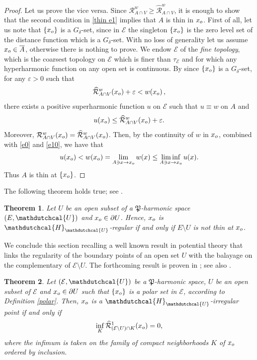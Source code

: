 \documentclass{amsart}
\newtheorem{thm}{Theorem}[section]
\numberwithin{equation}{section}
\def \Hd{{\mathdutchcal{H}}}
\def \Ec{{\mathcal{E}}}
\def \Ud{{\mathdutchcal{U}}}
\def \reduit{{\mathcal{R}}}
\def \balayage{{\widehat{\mathcal{R}}}}
\begin{document}
{{\begin{proof}
Let us prove the vice versa. Since $\reduit^w_{A \cap V} \geq \balayage^w_{A \cap V}$, it is enough to show that the second condition in \eqref{thin e1} implies that $A$ is thin in $x_{\rm o}$.  
First of all, let us note that $\{x_{\rm o}\}$ is a $G_\delta$-set, since in $\Ec$ the singleton $\{x_{\rm o }\}$ is the zero level set of the distance function which is a $G_\delta$-set.
With no loss of generality let us assume $x_{\rm o}  \in \overline{A}$, otherwise there is nothing to prove.
We  endow $\Ec$ of the {\it fine topology}, which is the coarsest topology on $\Ec$ which is finer than $\tau_{\Ec}$ and for which any hyperharmonic function on any open set is continuous. By \cite[Corollary 5.3.2]{CC72} since $\{x_{\rm o}\}$ is a $G_\delta$-set,  for any $\varepsilon>0$ such that
\begin{equation}\label{e0}
    \balayage^w_{A \cap V}(x_{\rm o}) + \varepsilon < 
    w(x_{\rm o})\,,
\end{equation}
there exists a positive superharmonic function $u$ on $\Ec$ such that $u \equiv w$ on $A$ and
\begin{equation}\label{e10}
    u(x_{\rm o}) \leq \balayage^w_{A \cap V}(x_{\rm o}) + \varepsilon.
\end{equation}
 Moreover, $\reduit^w_{A \cap V}(x_{\rm o}) = \balayage^w_{A \cap V}(x_{\rm o})$.
 Then, by the continuity of $w$ in $x_{\rm o}$, combined with \eqref{e0} and \eqref{e10}, we have that
 \[
 u(x_{\rm o}) < w(x_{\rm o}) = \lim_{A \ni x \to x_{\rm o}}w(x) \leq \liminf_{A \ni x \to x_{\rm o}}u(x).
 \]
 Thus $A$ is thin at $\{x_{\rm o}\}$.
\end{proof}
}
The following theorem holds true; see \cite[Theorem 6.3.3]{CC72}.

\begin{thm}\label{thin thm1}
Let $U$ be an open subset of a $\mathfrak{P}$-harmonic space $(E,\Ud)$ and $x_{\rm o} \in \partial U$. Hence, $x_{\rm o}$ is $\Hd_{\Ud}$-regular if and only if $E\setminus U$ is not thin at $x_{\rm o}$. 
\end{thm}




We conclude this section recalling a  well known result in potential theory that links the regularity of the boundary points of an open set $U$ with the balayage on the complementary of $\Ec \setminus U$. The forthcoming result is proven in \cite[Theorem 14]{NS84}; see also \cite[Theorem 4.6]{LU10}.

\begin{thm}
	\label{sec2 lemma}
	Let $(\Ec,\Ud)$ be a $\mathfrak{P}$-harmonic space, $U$ be an open subset of $\Ec$ and $x_{\rm o} \in \partial U$ such that $\{x_{\rm o}\}$ is a polar set in $\Ec$, according to Definition \textup{\ref{polar}}. Then, $x_{\rm o}$ is a $\Hd_{\Ud}$-irregular point if and only if
\begin{equation*}
	\inf_{K}\balayage^1_{(\Ec \setminus U) \cap K}(x_{\rm o}) =0,
\end{equation*}
where the infimum is taken on the family of compact neighborhoods $K$ of $x_{\rm o}$ ordered by inclusion.
\end{thm}


}
\end{document}
